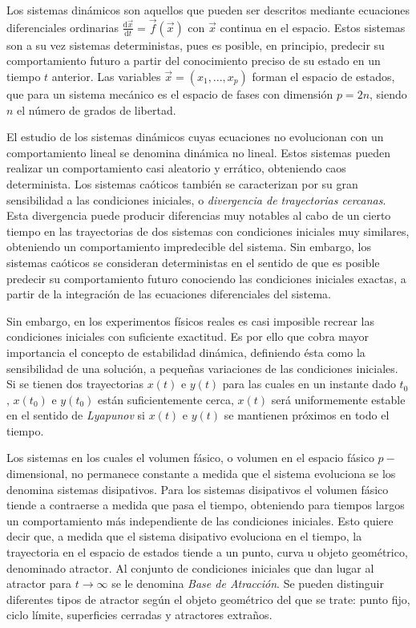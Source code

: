 

Los sistemas din\'amicos son aquellos que pueden ser descritos mediante ecuaciones diferenciales ordinarias $\frac{\mathrm{d}\vec{x}}{\mathrm{d}t} = \vec{f}(\vec{x})$ con $\vec{x}$ continua en el espacio. Estos sistemas son a su vez sistemas deterministas, pues es posible, en principio, predecir su comportamiento futuro a partir del conocimiento preciso de su estado en un tiempo $t$ anterior. Las variables $\vec{x} = (x_1,..., x_p)$ forman el espacio de estados, que para un sistema mec\'anico es el espacio de fases con dimensi\'on $p = 2n$, siendo $n$ el n\'umero de grados de libertad.

El estudio de los sistemas din\'amicos cuyas ecuaciones no evolucionan con un comportamiento lineal se denomina din\'amica no lineal. Estos sistemas pueden realizar un comportamiento casi aleatorio y err\'atico, obteniendo caos determinista. Los sistemas ca\'oticos tambi\'en se caracterizan por su gran sensibilidad a las condiciones iniciales, o \textit{divergencia de trayectorias cercanas}. Esta divergencia puede producir diferencias muy notables al cabo de un cierto tiempo en las trayectorias de dos sistemas con condiciones iniciales muy similares, obteniendo un comportamiento impredecible del sistema. Sin embargo, los sistemas ca\'oticos se consideran deterministas en el sentido de que es posible predecir su comportamiento futuro conociendo las condiciones iniciales exactas, a partir de la integraci\'on de las ecuaciones diferenciales del sistema.

Sin embargo, en los experimentos f\'isicos reales es casi imposible recrear las condiciones iniciales con suficiente exactitud. Es por ello que cobra mayor importancia el concepto de estabilidad din\'amica, definiendo \'esta como la sensibilidad de una soluci\'on, a pequeñas variaciones de las condiciones iniciales. Si se tienen dos trayectorias $x(t)$ e $y(t)$ para las cuales en un instante dado $t_0$, $x(t_0)$ e $y(t_0)$ est\'an suficientemente cerca, $x(t)$ ser\'a uniformemente estable en el sentido de \textit{Lyapunov} si $x(t)$ e $y(t)$ se mantienen pr\'oximos en todo el tiempo.

Los sistemas en los cuales el volumen f\'asico, o volumen en el espacio f\'asico $p-$dimensional, no permanece constante a medida que el sistema evoluciona se los denomina sistemas disipativos. Para los sistemas disipativos el volumen f\'asico tiende a contraerse a medida que pasa el tiempo, obteniendo para tiempos largos un comportamiento m\'as independiente de las condiciones iniciales. Esto quiere decir que, a medida que el sistema disipativo evoluciona en el tiempo, la trayectoria en el espacio de estados tiende a un punto, curva u objeto geom\'etrico, denominado atractor. Al conjunto de condiciones iniciales que dan lugar al atractor para $t \rightarrow \infty$ se le denomina \textit{Base de Atracci\'on}. Se pueden distinguir diferentes tipos de atractor seg\'un el objeto geom\'etrico del que se trate: punto fijo, ciclo l\'imite, superficies cerradas y atractores extraños.

